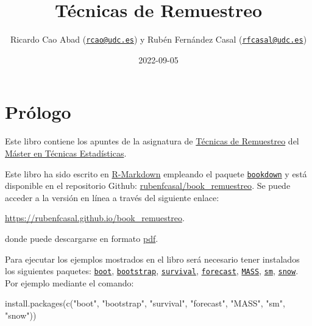 \documentclass[
]{book}
\title{Técnicas de Remuestreo}
\author{Ricardo Cao Abad (\href{mailto:rcao@udc.es}{\nolinkurl{rcao@udc.es}}) y Rubén Fernández Casal (\href{mailto:rfcasal@udc.es}{\nolinkurl{rfcasal@udc.es}})}
\date{2022-09-05}
\newenvironment{Shaded}{\begin{snugshade}}{\end{snugshade}}
\newcommand{\FunctionTok}[1]{\textcolor[rgb]{0.00,0.00,0.00}{#1}}
\newcommand{\NormalTok}[1]{#1}
\newcommand{\StringTok}[1]{\textcolor[rgb]{0.31,0.60,0.02}{#1}}
\theoremstyle{break}
\theoremstyle{definition}
\theoremstyle{definition}
\theoremstyle{definition}
\theoremstyle{definition}
\theoremstyle{remark}
\begin{document}
\maketitle

{
\setcounter{tocdepth}{1}
\tableofcontents
}
\hypertarget{pruxf3logo}{%
\chapter*{Prólogo}\label{pruxf3logo}}

Este libro contiene los apuntes de la asignatura de \href{http://eamo.usc.es/pub/mte/index.php/es/?option=com_content\&view=article\&id=2202\&idm=22\&a\%C3\%B1o=2019}{Técnicas de Remuestreo} del \href{http://eio.usc.es/pub/mte}{Máster en Técnicas Estadísticas}.

Este libro ha sido escrito en \href{http://rmarkdown.rstudio.com}{R-Markdown} empleando el paquete \href{https://bookdown.org/yihui/bookdown/}{\texttt{bookdown}} y está disponible en el repositorio Github: \href{https://github.com/rubenfcasal/book_remuestreo}{rubenfcasal/book\_remuestreo}.
Se puede acceder a la versión en línea a través del siguiente enlace:

\url{https://rubenfcasal.github.io/book_remuestreo}.

donde puede descargarse en formato \href{https://rubenfcasal.github.io/book_remuestreo/book_remuestreo.pdf}{pdf}.

Para ejecutar los ejemplos mostrados en el libro será necesario tener instalados los siguientes paquetes:
\href{https://CRAN.R-project.org/package=boot}{\texttt{boot}}, \href{https://CRAN.R-project.org/package=bootstrap}{\texttt{bootstrap}}, \href{https://CRAN.R-project.org/package=survival}{\texttt{survival}}, \href{https://CRAN.R-project.org/package=forecast}{\texttt{forecast}}, \href{https://CRAN.R-project.org/package=MASS}{\texttt{MASS}}, \href{https://CRAN.R-project.org/package=sm}{\texttt{sm}}, \href{https://CRAN.R-project.org/package=snow}{\texttt{snow}}.
Por ejemplo mediante el comando:

\begin{Shaded}
\begin{Highlighting}[]
\FunctionTok{install.packages}\NormalTok{(}\FunctionTok{c}\NormalTok{(}\StringTok{"boot"}\NormalTok{, }\StringTok{"bootstrap"}\NormalTok{, }\StringTok{"survival"}\NormalTok{, }\StringTok{"forecast"}\NormalTok{, }\StringTok{"MASS"}\NormalTok{, }\StringTok{"sm"}\NormalTok{, }\StringTok{"snow"}\NormalTok{))}
\end{Highlighting}
\end{Shaded}
\end{document}
